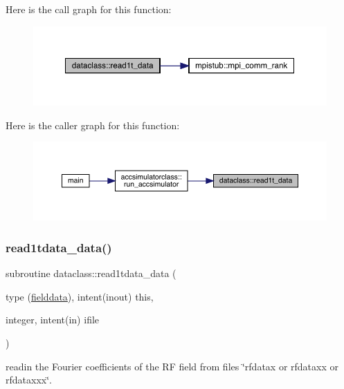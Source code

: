 Here is the call graph for this function\+:\nopagebreak
\begin{figure}[H]
\begin{center}
\leavevmode
\includegraphics[width=350pt]{namespacedataclass_a8a4f016b0eeea3567fb59c4100c5cdc5_cgraph}
\end{center}
\end{figure}
Here is the caller graph for this function\+:\nopagebreak
\begin{figure}[H]
\begin{center}
\leavevmode
\includegraphics[width=350pt]{namespacedataclass_a8a4f016b0eeea3567fb59c4100c5cdc5_icgraph}
\end{center}
\end{figure}
\mbox{\label{namespacedataclass_a5167a50ad979e317b65f07bf468212d8}} 
\subsubsection{\texorpdfstring{read1tdata\_data()}{read1tdata\_data()}}
{\footnotesize\ttfamily subroutine dataclass\+::read1tdata\+\_\+data (\begin{DoxyParamCaption}\item[{type (\mbox{\hyperlink{namespacedataclass_structdataclass_1_1fielddata}{fielddata}}), intent(inout)}]{this,  }\item[{integer, intent(in)}]{ifile }\end{DoxyParamCaption})}



readin the Fourier coefficients of the RF field from files \char`\"{}rfdatax or rfdataxx or rfdataxxx\char`\"{}. 

